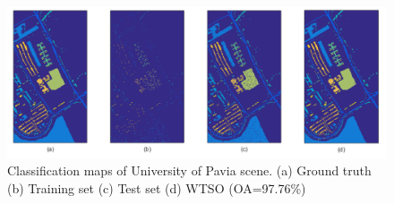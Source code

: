 \documentclass{ws-ijwmip}
\begin{document}
\begin{figure}[bh]
	\centerline{\includegraphics[width=12cm]{image/paviaMap}}
	\caption{Classification maps of University of Pavia scene. (a) Ground truth (b) Training set (c) Test set (d) WTSO (OA=97.76\%)}
	\label{figure8}
\end{figure}
\end{document}
